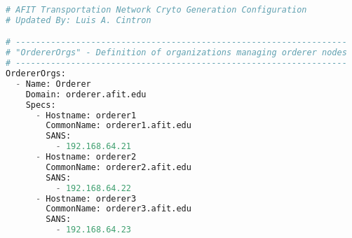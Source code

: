 \begin{lstlisting}[language=python]
# AFIT Transportation Network Cryto Generation Configuration
# Updated By: Luis A. Cintron

# ------------------------------------------------------------------
# "OrdererOrgs" - Definition of organizations managing orderer nodes
# ------------------------------------------------------------------
OrdererOrgs:
  - Name: Orderer
    Domain: orderer.afit.edu
    Specs:
      - Hostname: orderer1
        CommonName: orderer1.afit.edu
        SANS:
          - 192.168.64.21
      - Hostname: orderer2
        CommonName: orderer2.afit.edu
        SANS:
          - 192.168.64.22
      - Hostname: orderer3
        CommonName: orderer3.afit.edu
        SANS:
          - 192.168.64.23

\end{lstlisting}